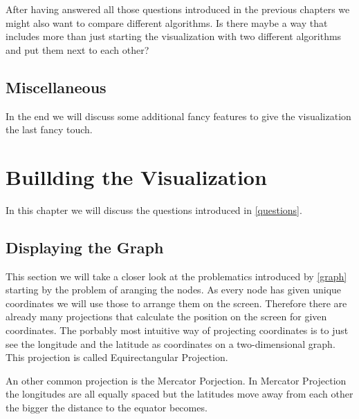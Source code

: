 \documentclass
[
	paper = a4,
    pagesize,
	12 pt,
	oneside,                       %
    open = right,
	DIV = calc,
	BCOR = 0 mm,                   %
	bibtotoc
]
{scrbook}
\begin{document}
After having answered all those questions introduced in the previous chapters we might also want to compare different algorithms. Is there maybe a way that includes more than just starting the visualization with two different algorithms and put them next to each other?



\section{Miscellaneous}


In the end we will discuss some additional fancy features to give the visualization the last fancy touch.


\chapter{Buillding the Visualization}

In this chapter we will discuss the questions introduced in \ref{questions}.


\section{Displaying the Graph}

This section we will take a closer look at the problematics introduced by \ref{graph} starting by the problem of aranging the nodes.
As every node has given unique coordinates we will use those to arrange them on the screen.
Therefore there are already many projections that calculate the position on the screen for given coordinates.
The porbably most intuitive way of projecting coordinates is to just see the longitude and the latitude as coordinates on a two-dimensional graph.
This projection is called Equirectangular Projection.
\par
An other common projection is the Mercator Porjection.
In Mercator Projection the longitudes are all equally spaced but the latitudes move away from each other the bigger the distance to the equator becomes.
\end{document}
